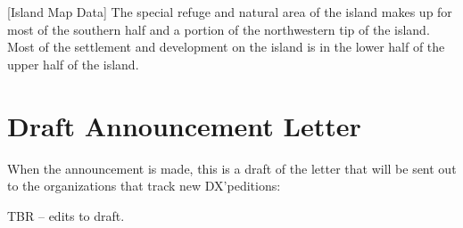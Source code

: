 \documentclass[11pt]{article}
\begin{document}
\noindent%
\begin{minipage}{\linewidth}%
\captionsetup{width=0.8\linewidth}
[Island Map Data]{ The special refuge and natural
area of the island makes up for most of the southern half and a portion
of the northwestern tip of the island.   Most of the settlement
and development on the island is in the lower half of the upper half
of the island.}
\label{geol3}
\end{minipage}
\vskip5mm

\section{Draft Announcement Letter}

When the announcement is made, this is a draft of the 
letter that will be sent out to the organizations
that track new DX'peditions:
\par
TBR -- edits to draft.
\par
\end{document}
